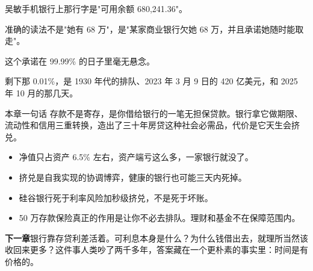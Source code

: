 \bookbreak

吴敏手机银行上那行字是"可用余额 680,241.36"。

准确的读法不是"她有 68 万"，是"某家商业银行欠她 68 万，并且承诺她随时能取走"。

这个承诺在 99.99\% 的日子里毫无悬念。

剩下那 0.01\%，是 1930 年代的排队、2023 年 3 月 9 日的 420 亿美元，和 2025 年 10 月的那几天。

\begin{takeaway}{本章一句话}
存款不是寄存，是你借给银行的一笔无担保贷款。银行拿它做期限、流动性和信用三重转换，造出了三十年房贷这种社会必需品，代价是它天生会挤兑。

\begin{itemize}
  \item 净值只占资产 6.5\% 左右，资产端亏这么多，一家银行就没了。
  \item 挤兑是自我实现的协调博弈，健康的银行也可能三天内死掉。
  \item 硅谷银行死于利率风险加秒级挤兑，不是死于坏账。
  \item 50 万存款保险真正的作用是让你不必去排队。理财和基金不在保障范围内。
\end{itemize}

\end{takeaway}

\begin{bridgebox}
\textbf{下一章}银行靠存贷利差活着。可利息本身是什么？为什么钱借出去，就理所当然该收回来更多？这件事人类吵了两千多年，答案藏在一个更朴素的事实里：时间是有价格的。
\end{bridgebox}

